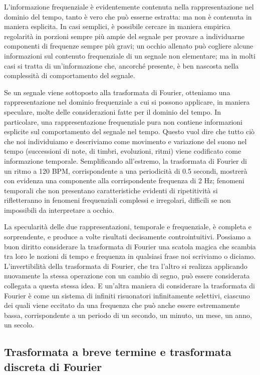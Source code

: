 \documentclass[11pt]{report}
\begin{document}
L'informazione frequenziale è evidentemente contenuta nella rappresentazione nel dominio del tempo, tanto è vero che può esserne estratta: ma non è contenuta in maniera esplicita. In casi semplici, è possibile cercare in maniera empirica regolarità in porzioni sempre più ampie del segnale per provare a individuarne componenti di frequenze sempre più gravi; un occhio allenato può cogliere alcune informazioni sul contenuto frequenziale di un segnale non elementare; ma in molti casi si tratta di un'informazione che, ancorché presente, è ben nascosta nella complessità di comportamento del segnale.

Se un segnale viene sottoposto alla trasformata di Fourier, otteniamo una rappresentazione nel dominio frequenziale a cui si possono applicare, in maniera speculare, molte delle considerazioni fatte per il dominio del tempo. In particolare, una rappresentazione frequenziale pura non contiene informazioni esplicite sul comportamento del segnale nel tempo. Questo vuol dire che tutto ciò che noi individuiamo e descriviamo come movimento e variazione del suono nel tempo (successioni di note, di timbri, evoluzioni, ritmi) viene codificato come informazione temporale. Semplificando all'estremo, la trasformata di Fourier di un ritmo a 120 BPM, corrispondente a una periodicità di 0.5 secondi, mostrerà con evidenza una componente alla corrispondente frequenza di 2 Hz; fenomeni temporali che non presentano caratteristiche evidenti di ripetitività si rifletteranno in fenomeni frequenziali complessi e irregolari, difficili se non impossibili da interpretare a occhio. 

La specularità delle due rappresentazioni, temporale e frequenziale, è completa e sorprendente, e produce a volte risultati decisamente controintuitivi. Possiamo a buon diritto considerare la trasformata di Fourier una scatola magica che scambia tra loro le nozioni di tempo e frequenza in qualsiasi frase noi scriviamo o diciamo. L'invertibilità della trasformata di Fourier, che tra l'altro si realizza applicando nuovamente la stessa operazione con un cambio di segno, può essere considerata collegata a questa stessa idea. E un'altra maniera di considerare la trasformata di Fourier è come un sistema di infiniti risuonatori infinitamente selettivi, ciascuno dei quali viene eccitato da una frequenza che può anche essere estremamente bassa, corrispondente a un periodo di un secondo, un minuto, un mese, un anno, un secolo.


\subsection{Trasformata a breve termine e trasformata discreta di Fourier}
\end{document}
